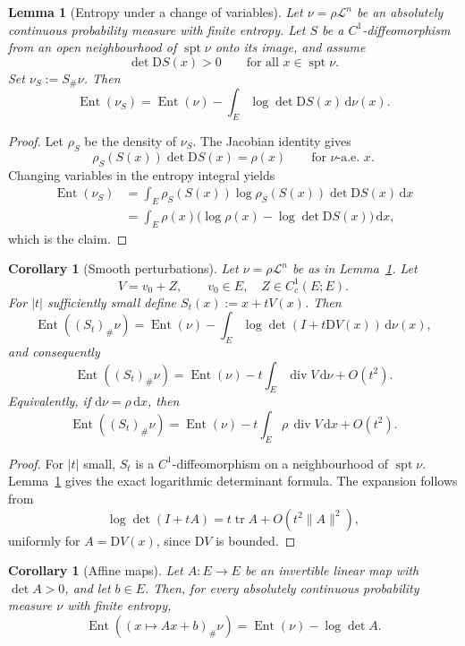 \documentclass[a4paper,11pt]{article}
\numberwithin{equation}{section}
\newtheorem{lemma}[theorem]{Lemma}
\newtheorem{corollary}[theorem]{Corollary}
\newcommand{\Ent}{\operatorname{Ent}}
\newcommand{\supp}{\operatorname{spt}}
\newcommand{\dd}{\mathrm d}
\newcommand{\D}{\mathrm D}
\begin{document}
	\begin{lemma}[Entropy under a change of variables]
		\label{lem:entropy-change-of-variables}
		Let \(\nu=\rho\mathcal L^n\) be an absolutely continuous probability measure with finite entropy. Let \(S\) be a \(C^1\)-diffeomorphism from an open neighbourhood of \(\supp\nu\) onto its image, and assume
		\[
		\det \D S(x)>0
		\qquad\text{for all }x\in\supp\nu.
		\]
		Set \(\nu_S:=S_\#\nu\). Then
		\[
		\Ent(\nu_S)
		=\Ent(\nu)-\int_E \log\det\D S(x)\,\dd\nu(x).
		\]
	\end{lemma}
	
	\begin{proof}
		Let \(\rho_S\) be the density of \(\nu_S\). The Jacobian identity gives
		\[
		\rho_S(S(x))\det\D S(x)=\rho(x)
		\qquad\text{for }\nu\text{-a.e. }x.
		\]
		Changing variables in the entropy integral yields
		\[
		\begin{aligned}
			\Ent(\nu_S)
			&=\int_E \rho_S(S(x))\log\rho_S(S(x))\det\D S(x)\,\dd x \\
			&=\int_E \rho(x)\bigl(\log\rho(x)-\log\det\D S(x)\bigr)\,\dd x,
		\end{aligned}
		\]
		which is the claim.
	\end{proof}
	
	\begin{corollary}[Smooth perturbations]
		\label{cor:smooth-perturbation-entropy}
		Let \(\nu=\rho\mathcal L^n\) be as in Lemma~\ref{lem:entropy-change-of-variables}. Let
		\[
		V=v_0+Z,
		\qquad v_0\in E,\quad Z\in C_c^1(E;E).
		\]
		For \(|t|\) sufficiently small define \(S_t(x):=x+tV(x)\). Then
		\[
		\Ent((S_t)_\#\nu)
		=\Ent(\nu)-\int_E\log\det(I+t\D V(x))\,\dd\nu(x),
		\]
		and consequently
		\[
		\Ent((S_t)_\#\nu)
		=\Ent(\nu)-t\int_E \operatorname{div}V\,\dd\nu+O(t^2).
		\]
		Equivalently, if \(\dd\nu=\rho\,\dd x\), then
		\[
		\Ent((S_t)_\#\nu)
		=\Ent(\nu)-t\int_E \rho\,\operatorname{div}V\,\dd x+O(t^2).
		\]
	\end{corollary}
	
	\begin{proof}
		For \(|t|\) small, \(S_t\) is a \(C^1\)-diffeomorphism on a neighbourhood of \(\supp\nu\). Lemma~\ref{lem:entropy-change-of-variables} gives the exact logarithmic determinant formula. The expansion follows from
		\[
		\log\det(I+tA)=t\operatorname{tr}A+O(t^2\|A\|^2),
		\]
		uniformly for \(A=\D V(x)\), since \(\D V\) is bounded.
	\end{proof}
	
	\begin{corollary}[Affine maps]
		\label{cor:affine-entropy}
		Let \(A:E\to E\) be an invertible linear map with \(\det A>0\), and let \(b\in E\). Then, for every absolutely continuous probability measure \(\nu\) with finite entropy,
		\[
		\Ent((x\mapsto Ax+b)_\#\nu)
		=\Ent(\nu)-\log\det A.
		\]
	\end{corollary}
	
\end{document}
